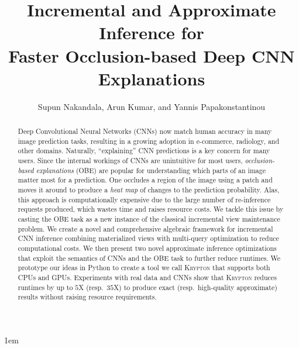 \documentclass[10pt, sigconf]{acmart}
\begin{document}
\emergencystretch 1em

\title{Incremental and Approximate Inference for\\Faster Occlusion-based Deep CNN Explanations}

\author{Supun Nakandala, Arun Kumar, and Yannis Papakonstantinou}


\begin{abstract}
Deep Convolutional Neural Networks (CNNs) now match human accuracy in many image prediction tasks, resulting in a growing adoption in e-commerce, radiology, and other domains. Naturally, ``explaining'' CNN predictions is a key concern for many users. Since the internal workings of CNNs are unintuitive for most users, \textit{occlusion-based explanations} (OBE) are popular for understanding which parts of an image matter most for a prediction. One occludes a region of the image using a patch and moves it around to produce a \textit{heat map} of changes to the prediction probability. Alas, this approach is computationally expensive due to the large number of re-inference requests produced, which wastes time and raises resource costs. We tackle this issue by casting the OBE task as a new instance of the classical incremental view maintenance problem. We create a novel and comprehensive algebraic framework for incremental CNN inference combining materialized views with multi-query optimization to reduce computational costs. We then present two novel approximate inference optimizations that exploit the semantics of CNNs and the OBE task to further reduce runtimes. We prototype our ideas in Python to create a tool we call \textsc{Krypton} that supports both CPUs and GPUs. Experiments with real data and CNNs show that \textsc{Krypton} reduces runtimes by up to $5$X (resp.~$35$X) to produce exact (resp.~high-quality approximate) results without raising resource requirements.
\end{abstract}

\maketitle



% 






\end{document}
